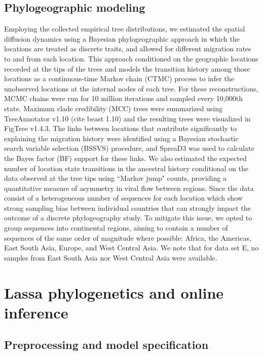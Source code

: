 \subsection{Phylogeographic modeling}

Employing the collected empirical tree distributions, we estimated the spatial diffusion dynamics using a Bayesian phylogeographic approach in which the locations are treated as discrete traits, and allowed for different migration rates to and from each location.
This approach conditioned on the geographic locations recorded at the tips of the trees and models the transition history among those locations as a continuous-time Markov chain (CTMC) process to infer the unobserved locations at the internal nodes of each tree.
For these reconstructions, MCMC chains were run for 10 million iterations and sampled every 10,000th state.
Maximum clade credibility (MCC) trees were summarized using TreeAnnotator v1.10 (cite \gls{beast} 1.10) and the resulting trees were visualized in FigTree v1.4.3.
The links between locations that contribute significantly to explaining the migration history were identified using a Bayesian stochastic search variable selection (BSSVS) procedure, and SpreaD3 %
was used to calculate the Bayes factor (BF) support for these links.
We also estimated the expected number of location state transitions in the ancestral history conditional on the data observed at the tree tips using ``Markov jump" counts, providing a quantitative measure of asymmetry in viral flow between regions.
Since the data consist of a heterogeneous number of sequences for each location which show strong sampling bias between individual countries that can strongly impact the outcome of a discrete phylogeography study.
To mitigate this issue, we opted to group sequences into continental regions, aiming to contain a number of sequences of the same order of magnitude where possible: Africa, the Americas, East South Asia, Europe, and West Central Asia. %
We note that for data set E, no samples from East South Asia nor West Central Asia were available.


\section{Lassa phylogenetics and online inference}

\subsection{Preprocessing and model specification}

